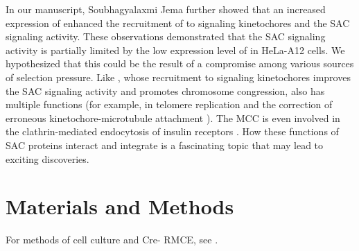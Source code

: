 In our manuscript, Soubhagyalaxmi Jema further showed that an increased expression of  enhanced the recruitment of  to signaling kinetochores and the SAC signaling activity. These observations demonstrated that the SAC signaling activity is partially limited by the low expression level of  in HeLa-A12 cells. We hypothesized that this could be the result of a compromise among various sources of selection pressure. Like , whose recruitment to signaling kinetochores improves the SAC signaling activity and promotes chromosome congression,  also has multiple functions (for example, in telomere replication \cite{BUB3-BUB1_TelomereReplication} and the correction of erroneous kinetochore-microtubule attachment \cite{BUB1_pH2A_AuroraB}). The MCC is even involved in the clathrin-mediated endocytosis of insulin receptors \cite{MCC_IREndocytosis, Choi2019}. How these functions of SAC proteins interact and integrate is a fascinating topic that may lead to exciting discoveries. %

\section{Materials and Methods}
For methods of cell culture and Cre- RMCE, see .
